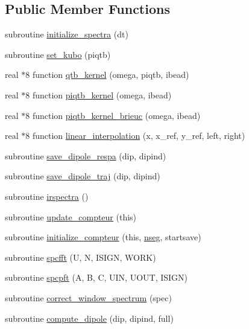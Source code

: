 \subsection*{Public Member Functions}
\begin{DoxyCompactItemize}
\item 
subroutine \hyperlink{classspectra_a4a17d005e7b8dbe1580a0f7d51e37d65}{initialize\-\_\-spectra} (dt)
\item 
subroutine \hyperlink{classspectra_a10513029c1c86dea5af09f8ce496db3d}{set\-\_\-kubo} (piqtb)
\item 
real $\ast$8 function \hyperlink{classspectra_a27d2053c9090bc63d7ae14d7edc29abd}{qtb\-\_\-kernel} (omega, piqtb, ibead)
\item 
real $\ast$8 function \hyperlink{classspectra_a23922ac2fd96129f594aa533edc82fc7}{piqtb\-\_\-kernel} (omega, ibead)
\item 
real $\ast$8 function \hyperlink{classspectra_aa68c292c3f1ec44529916b6e6c9ed807}{piqtb\-\_\-kernel\-\_\-brieuc} (omega, ibead)
\item 
real $\ast$8 function \hyperlink{classspectra_ab056deac13281e59def28844beb05a26}{linear\-\_\-interpolation} (x, x\-\_\-ref, y\-\_\-ref, left, right)
\item 
subroutine \hyperlink{classspectra_a9b1f0d6d3c04ba1863190784780751d4}{save\-\_\-dipole\-\_\-respa} (dip, dipind)
\item 
subroutine \hyperlink{classspectra_a1ad1abce235eaddeec0c196eb507653e}{save\-\_\-dipole\-\_\-traj} (dip, dipind)
\item 
subroutine \hyperlink{classspectra_a3e969bc7b33a5b61ecf93296815e8bb2}{irspectra} ()
\item 
subroutine \hyperlink{classspectra_ac2c09ba2810302183a13063cfbf7befe}{update\-\_\-compteur} (this)
\item 
subroutine \hyperlink{classspectra_a09f515460d74e0244dfe51890780af40}{initialize\-\_\-compteur} (this, \hyperlink{classspectra_ac0e35bcddedb3fbda30b8a359da97b94}{nseg}, startsave)
\item 
subroutine \hyperlink{classspectra_abf83fa40a337b0987dae16f9880e4170}{spcfft} (U, N, I\-S\-I\-G\-N, W\-O\-R\-K)
\item 
subroutine \hyperlink{classspectra_a2db6c8f0d284eccd5ae058b715e4f0f2}{spcpft} (A, B, C, U\-I\-N, U\-O\-U\-T, I\-S\-I\-G\-N)
\item 
subroutine \hyperlink{classspectra_a4e7bb730a7f2a0d12befe53d282f4f5a}{correct\-\_\-window\-\_\-spectrum} (spec)
\item 
subroutine \hyperlink{classspectra_a1beaa2ea2ce39b67a6a240d6a439b379}{compute\-\_\-dipole} (dip, dipind, full)
\end{DoxyCompactItemize}
